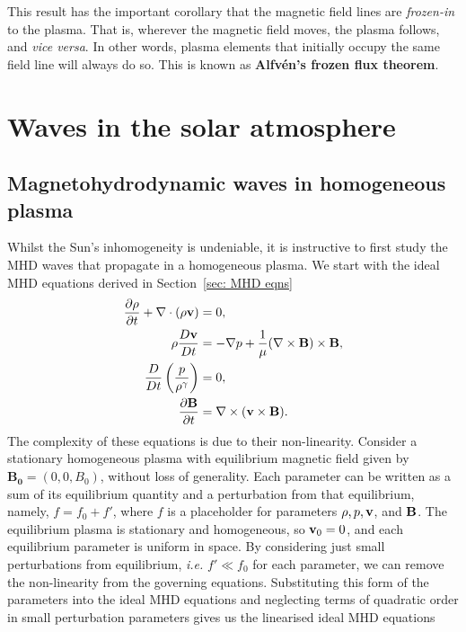 \documentclass[12pt]{../style-files/ociamthesis}
\begin{document}
This result has the important corollary that the magnetic field lines are \textit{frozen-in} to the plasma. That is, wherever the magnetic field moves, the plasma follows, and \textit{vice versa}. In other words, plasma elements that initially occupy the same field line will always do so. This is known as \textbf{Alfv\'{e}n's frozen flux theorem}.


\section{Waves in the solar atmosphere}
\label{sec: waves}

\subsection{Magnetohydrodynamic waves in homogeneous plasma}
Whilst the Sun's inhomogeneity is undeniable, it is instructive to first study the MHD waves that propagate in a homogeneous plasma. We start with the ideal MHD equations derived in Section~\ref{sec: MHD eqns}
\begin{align}
	\frac{\partial\rho}{\partial t} + \nabla\cdot(\rho \mathbf{v}) &= 0, \\
	\rho\frac{D\mathbf{v}}{Dt} &= -\nabla p + \frac{1}{\mu}(\nabla\times\mathbf{B})\times\mathbf{B}, \\
	\frac{D}{Dt}\left(\frac{p}{\rho^\gamma}\right) &= 0, \\
	\frac{\partial\mathbf{B}}{\partial t} &= \nabla\times(\mathbf{v}\times\mathbf{B}).
\end{align}
The complexity of these equations is due to their non-linearity. Consider a stationary homogeneous plasma with equilibrium magnetic field given by $\mathbf{B_0} = (0, 0, B_0)$, without loss of generality. Each parameter can be written as a sum of its equilibrium quantity and a perturbation from that equilibrium, namely, $f = f_0 + f'$, where $f$ is a placeholder for parameters $\rho, p, \mathbf{v}$, and $\mathbf{B}$. The equilibrium plasma is stationary and homogeneous, so $\mathbf{v}_0 = 0$, and each equilibrium parameter is uniform in space. By considering just small perturbations from equilibrium, \textit{i.e.} $f' \ll f_0$ for each parameter, we can remove the non-linearity from the governing equations. Substituting this form of the parameters into the ideal MHD equations and neglecting terms of quadratic order in small perturbation parameters gives us the linearised ideal MHD equations
\end{document}
